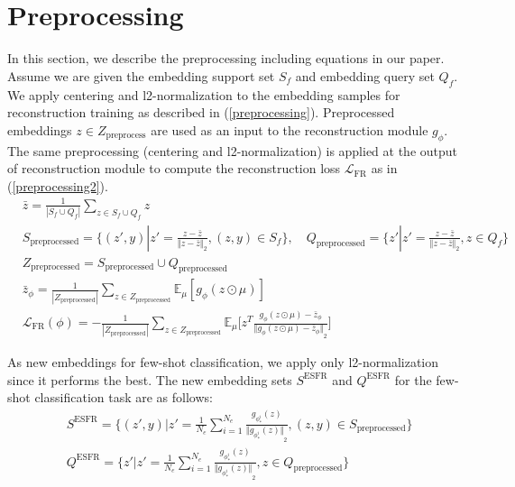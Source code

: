 \documentclass{article}
\begin{document}
\section{Preprocessing}
In this section, we describe the preprocessing including equations in our paper.
Assume we are given the embedding support set $S_f$ and embedding query set $Q_f$.
We apply centering and l2-normalization to the embedding samples for reconstruction training as described in (\ref{preprocessing}).
Preprocessed embeddings $z\in Z_\text{preprocess}$ are used as an input to the reconstruction module $g_\phi$.
The same preprocessing (centering and l2-normalization) is applied at the output of reconstruction module to compute the reconstruction loss $\mathcal{L}_\text{FR}$ as in (\ref{preprocessing2}).
\begin{align}
&\bar{z} = \frac{1}{|S_f\cup Q_f|} \sum_{z\in S_f\cup Q_f} z \\
&S_\text{preprocessed} = \Big\{(z', y)|z'=\frac{z-\bar{z}}{{\Vert z-\bar{z} \Vert}_2}, (z, y)\in S_f\Big\}, \quad Q_\text{preprocessed} = \Big\{z'|z'=\frac{z-\bar{z}}{{\Vert z-\bar{z} \Vert}_2}, z\in Q_f\Big\} \label{preprocessing}\\
&Z_\text{preprocessed} = S_\text{preprocessed} \cup Q_\text{preprocessed} \\
&\bar{z}_\phi = \frac{1}{|Z_\text{preprocessed}|}\sum_{z\in Z_\text{preprocessed}} \mathbb{E}_\mu [g_\phi(z\odot\mu)] \\
&\mathcal{L}_\text{FR}(\phi) = - \frac{1}{|Z_\text{preprocessed}|}\sum_{z\in Z_\text{preprocessed}} \mathbb{E}_\mu \Big[z^T \frac{g_\phi(z\odot \mu) - \bar{z}_\phi}{{\Vert g_\phi(z\odot \mu) - \bar{z}_\phi \Vert}_2}\Big] \label{preprocessing2}
\end{align}

As new embeddings for few-shot classification, we apply only l2-normalization since it performs the best.
The new embedding sets $S^\text{ESFR}$ and $Q^\text{ESFR}$ for the few-shot classification task are as follows:
\begin{align}
& S^\text{ESFR} = \Big\{(z',y)|z'=\frac{1}{N_e}\sum_{i=1}^{N_e}\frac{g_{\phi_*^i}(z)}{{\Vert g_{\phi_*^i}(z) \Vert}_2}, (z,y)\in S_\text{preprocessed} \Big\} \\
& Q^\text{ESFR} = \Big\{z'|z'=\frac{1}{N_e}\sum_{i=1}^{N_e}\frac{g_{\phi_*^i}(z)}{{\Vert g_{\phi_*^i}(z) \Vert}_2}, z\in Q_\text{preprocessed} \Big\}
\end{align}
\end{document}
